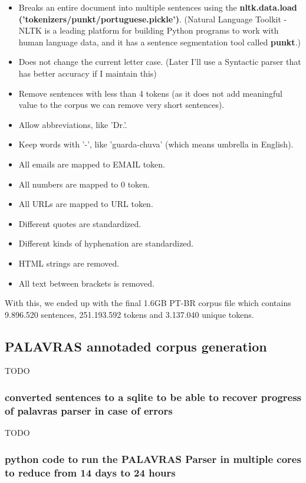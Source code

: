 \begin{itemize}
    \item Breaks an entire document into multiple sentences using the 
    \textbf{nltk.data.load ('tokenizers/punkt/portuguese.pickle')}. (Natural Language Toolkit - NLTK is a leading platform for building Python programs to work with human language data, and it has a sentence segmentation tool called \textbf{punkt}.)
    \item Does not change the current letter case. (Later I'll use a Syntactic parser that has better accuracy if I maintain this)
    \item Remove sentences with less than 4 tokens (as it does not add meaningful value to the corpus we can remove very short sentences).
    \item Allow abbreviations, like 'Dr.'.
    \item Keep words with '-', like 'guarda-chuva' (which means umbrella in English).
    \item All emails are mapped to EMAIL token.
    \item All numbers are mapped to 0 token.
    \item All URLs are mapped to URL token.
    \item Different quotes are standardized.
    \item Different kinds of hyphenation are standardized.
    \item HTML strings are removed.
    \item All text between brackets is removed.
\end{itemize}

With this, we ended up with the final 1.6GB PT-BR corpus file which contains 9.896.520 sentences, 251.193.592 tokens and 3.137.040 unique tokens.

\subsection{PALAVRAS annotaded corpus generation}

TODO

\subsubsection{converted sentences to a sqlite to be able to recover progress of palavras parser in case of errors}

TODO

\subsubsection{python code to run the PALAVRAS Parser in multiple cores to reduce from 14 days to 24 hours}

